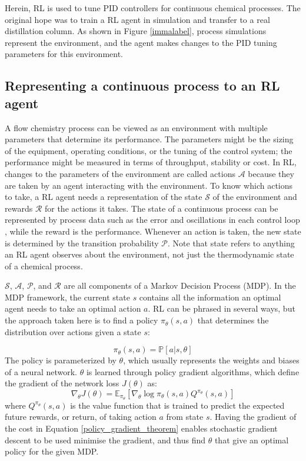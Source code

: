 Herein, RL is used to tune PID controllers for continuous chemical processes. The original hope was to train a RL agent in simulation and transfer to a real distillation column. As shown in Figure \ref{immalabel}, process simulations represent the environment, and the agent makes changes to the PID tuning parameters for this environment. 

\subsection{Representing a continuous process to an RL agent}
A flow chemistry process can be viewed as an environment with multiple parameters that determine its performance. The parameters might be the sizing of the equipment, operating conditions, or the tuning of the control system; the performance might be measured in terms of throughput, stability or cost. In RL, changes to the parameters of the environment are called actions $\mathcal A$ because they are taken by an agent interacting with the environment. To know which actions to take, a RL agent needs a representation of the state $\mathcal S$ of the environment and rewards $\mathcal R$ for the actions it takes. The state of a continuous process can be represented by process data such as the error and oscillations in each control loop \cite{Lee2005, Badgwell2019, Shin2019}, while the reward is the performance. Whenever an action is taken, the new state is determined by the transition probability $\mathcal P$. Note that state refers to anything an RL agent observes about the environment, not just the thermodynamic state of a chemical process.

$\mathcal S$, $\mathcal A$, $\mathcal P$, and $\mathcal R$ are all components of a Markov Decision Process (MDP). In the MDP framework, the current state $s$ contains all the information an optimal agent needs to take an optimal action $a$.  RL can be phrased in several ways, but the approach taken here is to find a policy $\pi_{\theta}(s,a)$ that determines the distribution over actions given a state $s$:

\begin{equation}
	\pi_{\theta}(s,a) = \mathbb P[a|s,\theta]
\end{equation}
The policy is parameterized by $\theta$, which usually represents the weights and biases of a neural network. $\theta$ is learned through policy gradient algorithms, which define the gradient of the network loss $J(\theta)$ as:
\begin{equation}
	\label{policy_gradient_theorem}
	\nabla_{\theta}J(\theta) = \mathbb E_{\pi_{\theta}} [\nabla_{\theta} \log \pi_\theta(s,a)Q^{\pi_{\theta}}(s,a)]
\end{equation}
where $Q^{\pi_{\theta}}(s,a)$ is the value function that is trained to predict the expected future rewards, or return, of taking action $a$ from state $s$. Having the gradient of the cost in Equation \ref{policy_gradient_theorem} enables stochastic gradient descent to be used minimise the gradient, and thus find $\theta$ that give an optimal policy for the given MDP.

